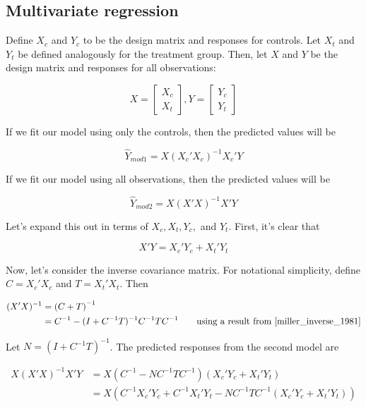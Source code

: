 \documentclass[12pt]{article}
\begin{document}
\subsection{Multivariate regression}
Define $X_c$ and $Y_c$ to be the design matrix and responses for controls.  
Let $X_t$ and $Y_t$ be defined analogously for the treatment group.
Then, let $X$ and $Y$ be the design matrix and responses for all observations:

$$X=\left[\begin{array}{c}
X_c \\
\hline
X_t
\end{array}\right],Y=\left[\begin{array}{c}
Y_c \\
\hline
Y_t
\end{array}\right]$$

If we fit our model using only the controls, then the predicted values will be

\begin{equation}
\hat{Y}_{mod1} = X(X_c'X_c)^{-1}X_c'Y
\end{equation}

If we fit our model using all observations, then the predicted values will be 

\begin{equation}
\hat{Y}_{mod2} = X(X'X)^{-1}X'Y
\end{equation}

Let's expand this out in terms of $X_c, X_t, Y_c,$ and $Y_t$.  First, it's clear that

\begin{equation}
X'Y = X_c'Y_c + X_t'Y_t
\end{equation}

Now, let's consider the inverse covariance matrix.  For notational simplicity, define $C = X_c'X_c$ and $T = X_t'X_t$.  Then

\begin{align*}
(X'X)^{-1} &= \left( C + T\right)^{-1} \\
&= C^{-1} - (I + C^{-1}T)^{-1}C^{-1}TC^{-1} \tag*{using a result from \cite{miller_inverse_1981}}
\end{align*}

Let $N = (I + C^{-1}T)^{-1}$.  The predicted responses from the second model are

\begin{align}
X(X'X)^{-1}X'Y &= X\left( C^{-1} - NC^{-1}TC^{-1}\right)\left( X_c'Y_c + X_t'Y_t \right) \\
&= X \left( C^{-1}X_c'Y_c + C^{-1}X_t'Y_t - NC^{-1}TC^{-1}(X_c'Y_c + X_t'Y_t)\right)
\end{align}
\end{document}
